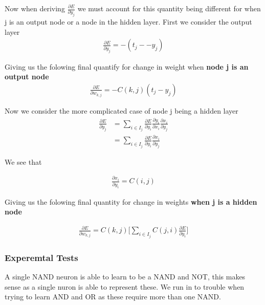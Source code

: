 \documentclass{article}
\begin{document}
Now when deriving $\frac{\partial E}{\partial y_j}$ we must account for this quantity being different for when j is an output node or a node in the hidden layer. First we consider the output layer
\begin{align}
\frac{\partial E}{\partial y_j} = -(t_j -- y_j)
\end{align}

Giving us the folowing final quantify for change in weight when \textbf{node j is an output node}
\begin{align}
\frac{\partial E}{\partial w_{k,j}} = -C(k, j)(t_j - y_j)
\end{align}

Now we consider the more complicated case of node j being a hidden layer
\begin{align*}
\frac{\partial E}{\partial y_j} &= \sum_{i \in I_j} \frac{\partial E}{\partial y_i} \frac{\partial y_i}{\partial x_i} \frac{\partial x_i}{\partial y_j} \\
&= \sum_{i \in I_j} \frac{\partial E}{\partial y_i} \frac{\partial x_i}{\partial y_j}
\end{align*}

We see that

\begin{align*}
\frac{\partial x_i}{\partial y_i} = C(i,j)
\end{align*}

Giving us the folowing final quantity for change in weights \textbf{when j is a hidden node}

\begin{align}
\frac{\partial E}{\partial w_{k,j}} = C(k,j) \bigg[ \sum_{i \in I_j} C(j, i) \frac{\partial E}{\partial y_i} \bigg]
\end{align}

\subsubsection{Experemtal Tests}
A single NAND neuron is able to learn to be a NAND and NOT, this makes sense as a single nuron is able to represent these. We run in to trouble when trying to learn AND and OR as these require more than one NAND.

\medskip


\end{document}
